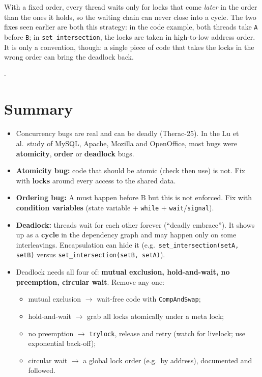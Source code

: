 \documentclass[11pt,a4paper]{article}
\makeatletter
\newcommand{\keepspace}[1]{\par\penalty-100\begingroup
  \setlength{\dimen@}{#1}\dimen@ii\pagegoal\advance\dimen@ii-\pagetotal
  \ifdim\dimen@>\dimen@ii\ifdim\dimen@ii>\z@\vfil\fi\break\fi\endgroup}
\makeatother
\begin{document}
With a fixed order, every thread waits only for locks that come
\emph{later} in the order than the ones it holds, so the waiting chain can
never close into a cycle. The two fixes seen earlier are both this
strategy: in the code example, both threads take \texttt{A} before
\texttt{B}; in \texttt{set\_intersection}, the locks are taken in
high-to-low address order. It is only a convention, though: a single piece
of code that takes the locks in the wrong order can bring the deadlock back.

\keepspace{20\baselineskip}
\section{Summary}

\begin{keybox}
\begin{itemize}
  \item Concurrency bugs are real and can be deadly (Therac-25). In the Lu et
        al.\ study of MySQL, Apache, Mozilla and OpenOffice, most bugs were
        \textbf{atomicity}, \textbf{order} or \textbf{deadlock} bugs.
  \item \textbf{Atomicity bug:} code that should be atomic (check then use)
        is not. Fix with \textbf{locks} around every access to the shared
        data.
  \item \textbf{Ordering bug:} A must happen before B but this is not
        enforced. Fix with \textbf{condition variables} (state variable +
        \texttt{while} + \texttt{wait}/\texttt{signal}).
  \item \textbf{Deadlock:} threads wait for each other forever (``deadly
        embrace''). It shows up as a \textbf{cycle} in the dependency graph
        and may happen only on some interleavings. Encapsulation can hide it
        (e.g.\ \texttt{set\_intersection(setA, setB)} versus
        \texttt{set\_intersection(setB, setA)}).
  \item Deadlock needs all four of: \textbf{mutual exclusion,
        hold-and-wait, no preemption, circular wait}. Remove any one:
    \begin{itemize}
      \item mutual exclusion \(\to\) wait-free code with
            \texttt{CompAndSwap};
      \item hold-and-wait \(\to\) grab all locks atomically under a meta
            lock;
      \item no preemption \(\to\) \texttt{trylock}, release and retry (watch
            for livelock; use exponential back-off);
      \item circular wait \(\to\) a global lock order (e.g.\ by address),
            documented and followed.
    \end{itemize}
\end{itemize}
\end{keybox}
\end{document}
